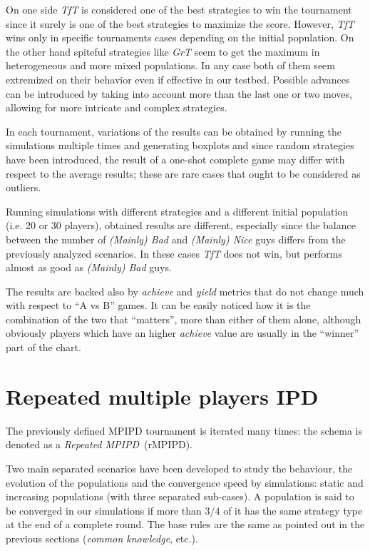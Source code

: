 \documentclass[journal,10pt,twoside]{IEEEtran}
\begin{document}
On one side \textit{TfT} is considered one of the best strategies to win the tournament since it surely is one of the best strategies to maximize the score. However, \textit{TfT} wins only in specific tournaments cases depending on the initial population. On the other hand spiteful strategies like \textit{GrT} seem to get the maximum in heterogeneous and more mixed populations. In any case both of them seem extremized on their behavior even if effective in our testbed. Possible advances can be introduced by taking into account more than the last one or two moves, allowing for more intricate and complex strategies.~\cite{mathieu2017}

In each tournament, variations of the results can be obtained by running the simulations multiple times and generating boxplots and since random strategies have been introduced, the result of a one-shot complete game may differ with respect to the average results; these are rare cases that ought to be considered as outliers.

Running simulations with different strategies and a different initial population (i.e. 20 or 30 players), obtained results are different, especially since the balance between the number of \textit{(Mainly) Bad} and \textit{(Mainly) Nice} guys differs from the previously analyzed scenarios. In these cases \textit{TfT} does not win, but performs almost as good as \textit{(Mainly) Bad} guys.

The results are backed also by \textit{achieve} and \textit{yield} metrics that do not change much with respect to ``A vs B'' games.
It can be easily noticed how it is the combination of the two that ``matters'', more than either of them alone, although obviously players which have an higher \textit{achieve} value are usually in the ``winner'' part of the chart.

\section{Repeated multiple players IPD} \label{s:rIPDMP}
The previously defined MPIPD tournament is iterated many times: the schema is denoted as a \textit{Repeated MPIPD}~(rMPIPD).

Two main separated scenarios have been developed to study the behaviour, the evolution of the populations and the convergence speed by simulations: static and increasing populations (with three separated sub-cases). A population is said to be converged in our simulations if more than $3/4$ of it has the same strategy type at the end of a complete round. The base rules are the same as pointed out in the previous sections (\textit{common knowledge},  etc.).
\end{document}
